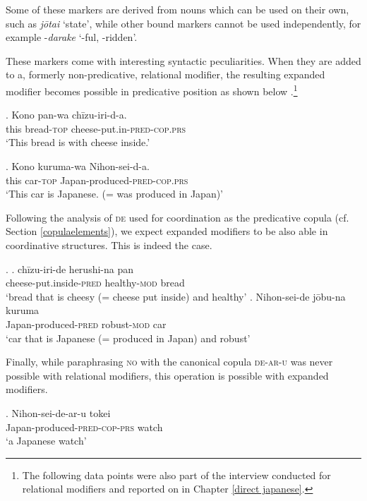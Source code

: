 Some of these markers are derived from nouns which can be used on their own, such as \textit{jōtai} `state’, while other bound markers cannot be used independently, for example -\textit{darake} `-ful, -ridden’.

These markers come with interesting syntactic peculiarities. When they are added to a, formerly non-predicative, relational modifier, the resulting expanded modifier becomes possible in predicative position as shown below \citep{nagano:2016:are, shimada:2018:relational}.\footnote{The following data points were also part of the interview conducted for relational modifiers and reported on in Chapter \ref{direct japanese}.}

\exg. Kono pan-wa chīzu-iri-d-a.\\
this bread-\textsc{top} cheese-put.in-\textsc{pred-cop.prs}\\
`This bread is with cheese inside.’

\exg. Kono kuruma-wa Nihon-sei-d-a.\\
this car-\textsc{top} Japan-produced-\textsc{pred-cop.prs}\\
`This car is Japanese. (= was produced in Japan)'

\largerpage
Following the analysis of \textsc{de} used for coordination as the predicative copula (cf. Section \ref{copulaelements}), we expect expanded modifiers to be also able in coordinative structures. This is indeed the case.  

\ex. \ag. chīzu-iri-de herushi-na pan\\
cheese-put.inside-\textsc{pred} healthy-\textsc{mod} bread\\
`bread that is cheesy (= cheese put inside) and healthy'
\bg. Nihon-sei-de jōbu-na kuruma\\
Japan-produced-\textsc{pred} robust-\textsc{mod} car\\
`car that is Japanese (= produced in Japan) and robust'

Finally, while paraphrasing \textsc{no} with the canonical copula \textsc{de-ar-u} was never possible with relational modifiers, this operation is possible with expanded modifiers.

\exg. Nihon-sei-de-ar-u tokei\\
Japan-produced-\textsc{pred-cop-prs} watch\\
`a Japanese watch' \null \hfill \citep[75]{shimada:2018:relational}

